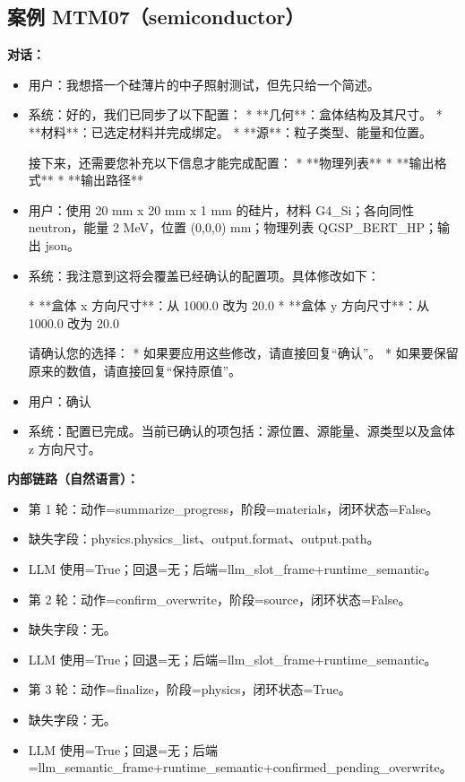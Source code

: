 \documentclass[11pt]{ctexart}
\begin{document}
\subsection{案例 MTM07（semiconductor）}
\textbf{对话：}
\begin{itemize}
\item 用户：我想搭一个硅薄片的中子照射测试，但先只给一个简述。
\item 系统：好的，我们已同步了以下配置：
*   **几何**：盒体结构及其尺寸。
*   **材料**：已选定材料并完成绑定。
*   **源**：粒子类型、能量和位置。

接下来，还需要您补充以下信息才能完成配置：
*   **物理列表**
*   **输出格式**
*   **输出路径**
\item 用户：使用 20 mm x 20 mm x 1 mm 的硅片，材料 G4\_Si；各向同性 neutron，能量 2 MeV，位置 (0,0,0) mm；物理列表 QGSP\_BERT\_HP；输出 json。
\item 系统：我注意到这将会覆盖已经确认的配置项。具体修改如下：

*   **盒体 x 方向尺寸**：从 1000.0 改为 20.0
*   **盒体 y 方向尺寸**：从 1000.0 改为 20.0

请确认您的选择：
*   如果要应用这些修改，请直接回复“确认”。
*   如果要保留原来的数值，请直接回复“保持原值”。
\item 用户：确认
\item 系统：配置已完成。当前已确认的项包括：源位置、源能量、源类型以及盒体 z 方向尺寸。
\end{itemize}
\textbf{内部链路（自然语言）：}
\begin{itemize}
\item 第 1 轮：动作=summarize\_progress，阶段=materials，闭环状态=False。
\item 缺失字段：physics.physics\_list、output.format、output.path。
\item LLM 使用=True；回退=无；后端=llm\_slot\_frame+runtime\_semantic。
\item 第 2 轮：动作=confirm\_overwrite，阶段=source，闭环状态=False。
\item 缺失字段：无。
\item LLM 使用=True；回退=无；后端=llm\_slot\_frame+runtime\_semantic。
\item 第 3 轮：动作=finalize，阶段=physics，闭环状态=True。
\item 缺失字段：无。
\item LLM 使用=True；回退=无；后端=llm\_semantic\_frame+runtime\_semantic+confirmed\_pending\_overwrite。
\end{itemize}
\end{document}
